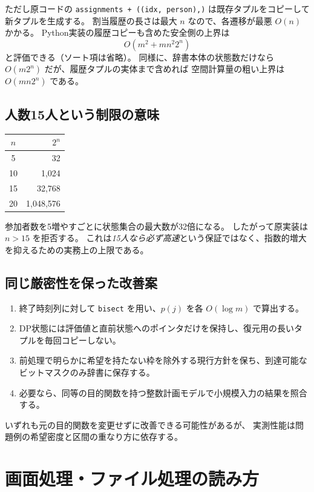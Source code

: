 \documentclass[11pt,a4paper]{ltjsarticle}
\theoremstyle{definition}
\theoremstyle{remark}
\newcommand{\code}[1]{\texttt{#1}}
\begin{document}
ただし原コードの
\code{assignments + ((idx, person),)} は既存タプルをコピーして新タプルを生成する。
割当履歴の長さは最大 $n$ なので、各遷移が最悪 $O(n)$ かかる。
Python実装の履歴コピーも含めた安全側の上界は
\begin{equation}
 \boxed{O(m^2+mn^2 2^n)}
 \label{eq:actualcomplex}
\end{equation}
と評価できる（ソート項は省略）。
同様に、辞書本体の状態数だけなら $O(m2^n)$ だが、履歴タプルの実体まで含めれば
空間計算量の粗い上界は $O(mn2^n)$ である。

\subsection{人数15人という制限の意味}
\begin{center}
\begin{tabular}{cr}
\toprule
$n$ & $2^n$ \\
\midrule
5 & 32 \\
10 & 1,024 \\
15 & 32,768 \\
20 & 1,048,576 \\
\bottomrule
\end{tabular}
\end{center}
参加者数を5増やすごとに状態集合の最大数が32倍になる。
したがって原実装は $n>15$ を拒否する。
これは\emph{15人なら必ず高速}という保証ではなく、指数的増大を抑えるための実務上の上限である。

\subsection{同じ厳密性を保った改善案}
\begin{enumerate}
\item 終了時刻列に対して \code{bisect} を用い、$p(j)$ を各 $O(\log m)$ で算出する。
\item DP状態には評価値と直前状態へのポインタだけを保持し、復元用の長いタプルを毎回コピーしない。
\item 前処理で明らかに希望を持たない枠を除外する現行方針を保ち、到達可能なビットマスクのみ辞書に保存する。
\item 必要なら、同等の目的関数を持つ整数計画モデルで小規模入力の結果を照合する。
\end{enumerate}
いずれも元の目的関数を変更せずに改善できる可能性があるが、
実測性能は問題例の希望密度と区間の重なり方に依存する。

\section{画面処理・ファイル処理の読み方}
\end{document}
